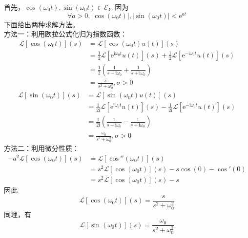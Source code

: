 \documentclass{ctexbook}
\begin{document}
\begin{example}[正弦、余弦函数]
    首先，$\cos(\omega_0 t),\sin(\omega_0 t)\in\mathcal{E}$，因为$$\forall a>0,|\cos(\omega_0 t)|,|\sin(\omega_0 t)|<\mathrm{e}^{a t}$$
    下面给出两种求解方法。\\
    方法一：利用欧拉公式化归为指数函数：
    \begin{align*}
        \mathcal{L}[\cos(\omega_0 t)](s)&=\mathcal{L}[\cos(\omega_0 t)u(t)](s)\\
        &=\frac{1}{2}\mathcal{L} [\mathrm{e}^{\mathrm{i}\omega_0 t}u(t)](s)+\frac{1}{2}\mathcal{L} [\mathrm{e}^{-\mathrm{i}\omega_0 t}u(t)](s)\\
        &=\frac{1}{2}\left(\frac{1}{s-\mathrm{i}\omega_0}+\frac{1}{s+\mathrm{i}\omega_0}\right)\\
        &=\frac{s}{s^2+\omega_0^2},\sigma>0
    \end{align*}
    \begin{align*}
        \mathcal{L}[\sin(\omega_0 t)](s)&=\mathcal{L} [\sin(\omega_0 t)u(t)](s)\\
        &=\frac{1}{2\mathrm{i}}\mathcal{L} [\mathrm{e}^{\mathrm{i}\omega_0 t}u(t)](s)-\frac{1}{2\mathrm{i}}\mathcal{L} [\mathrm{e}^{-\mathrm{i}\omega_0 t}u(t)](s)\\
        &=\frac{1}{2\mathrm{i}}\left(\frac{1}{s-\mathrm{i}\omega_0}-\frac{1}{s+\mathrm{i}\omega_0}\right)\\
        &=\frac{\omega_0}{s^2+\omega_0^2},\sigma>0
    \end{align*}
    方法二：利用微分性质：
    \begin{align*}
        -a^2\mathcal{L}[\cos(\omega_0 t)](s)&=\mathcal{L} [\cos''(\omega_0 t)](s)\\
        &=s^2\mathcal{L} [\cos(\omega_0 t)](s)-s\cos(0)-\cos'(0)\\
        &=s^2\mathcal{L} [\cos(\omega_0 t)](s)-s
    \end{align*}
    因此\[\mathcal{L} [\cos(\omega_0 t)](s)=\frac{s}{s^2+\omega_0^2}\]
    同理，有\[\mathcal{L} [\sin(\omega_0 t)](s)=\frac{\omega_0}{s^2+\omega_0^2}\]
\end{example}
\end{document}
